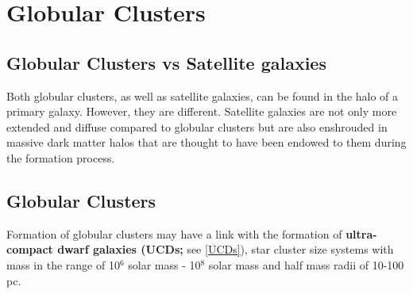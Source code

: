 \chapter{Globular Clusters}

\section{Globular Clusters vs Satellite galaxies}

Both globular clusters, as well as satellite galaxies, can be found in the halo of a primary galaxy. However, they are different. Satellite galaxies are not only more extended and diffuse compared to globular clusters but are also enshrouded in massive dark matter halos that are thought to have been endowed to them during the formation process. 

\section{Globular Clusters}

Formation of globular clusters may have a link with the formation of \textbf{ultra-compact dwarf galaxies (UCDs;} see \ref{UCDs}), star cluster size systems with mass in the range of 10$^6$ solar mass - 10$^8$ solar mass and half mass radii of 10-100 pc. 

